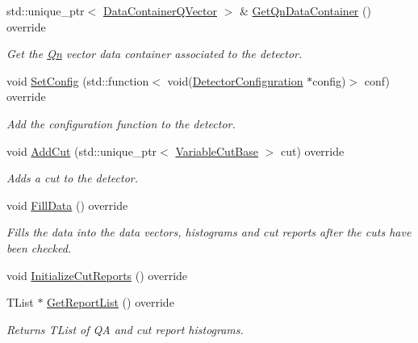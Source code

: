 \begin{DoxyCompactItemize}
std\+::unique\+\_\+ptr$<$ \mbox{\hyperlink{classQn_1_1DataContainer}{Data\+Container\+Q\+Vector}} $>$ \& \mbox{\hyperlink{classQn_1_1Detector_a9312033ff207a2caa762e895382f8456}{Get\+Qn\+Data\+Container}} () override
\begin{DoxyCompactList}\small\item\em Get the \mbox{\hyperlink{namespaceQn}{Qn}} vector data container associated to the detector. \end{DoxyCompactList}\item 
void \mbox{\hyperlink{classQn_1_1Detector_ac339acf64a05ab762a33137e2f00f84e}{Set\+Config}} (std\+::function$<$ void(\mbox{\hyperlink{classQn_1_1DetectorConfiguration}{Detector\+Configuration}} $\ast$config)$>$ conf) override
\begin{DoxyCompactList}\small\item\em Add the configuration function to the detector. \end{DoxyCompactList}\item 
void \mbox{\hyperlink{classQn_1_1Detector_a22b9795f3ae87d0b8ca483509907cbd1}{Add\+Cut}} (std\+::unique\+\_\+ptr$<$ \mbox{\hyperlink{structQn_1_1VariableCutBase}{Variable\+Cut\+Base}} $>$ cut) override
\begin{DoxyCompactList}\small\item\em Adds a cut to the detector. \end{DoxyCompactList}\item 
\mbox{\label{classQn_1_1Detector_a977d0c05f4b3a3e7b117b28b3eca25b7}} 
void \mbox{\hyperlink{classQn_1_1Detector_a977d0c05f4b3a3e7b117b28b3eca25b7}{Fill\+Data}} () override
\begin{DoxyCompactList}\small\item\em Fills the data into the data vectors, histograms and cut reports after the cuts have been checked. \end{DoxyCompactList}\item 
void \mbox{\hyperlink{classQn_1_1Detector_a0dba51a9ca021046bdfa9c7af262b3f7}{Initialize\+Cut\+Reports}} () override
\item 
T\+List $\ast$ \mbox{\hyperlink{classQn_1_1Detector_a88a7d5c31a81624f9918c75220ffdd8a}{Get\+Report\+List}} () override
\begin{DoxyCompactList}\small\item\em Returns T\+List of QA and cut report histograms. \end{DoxyCompactList}\item 

\end{DoxyCompactItemize}
